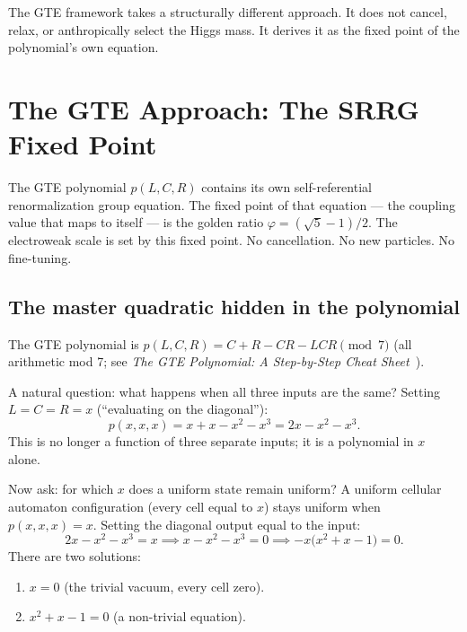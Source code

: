 \documentclass[11pt,a4paper]{article}
\begin{document}
\medskip

The GTE framework takes a structurally different approach.
It does not cancel, relax, or anthropically select the Higgs mass.
It derives it as the fixed point of the polynomial's own equation.

\section{The GTE Approach: The SRRG Fixed Point}
\label{sec:srrg}

\begin{tcolorbox}[colback=boxgreen,colframe=green!50!black,
  title=The key idea]
The GTE polynomial $p(L,C,R)$ contains its own self-referential
renormalization group equation.
The fixed point of that equation --- the coupling value that maps to itself ---
is the golden ratio $\varphi = (\sqrt{5}-1)/2$.
The electroweak scale is set by this fixed point.
No cancellation. No new particles. No fine-tuning.
\end{tcolorbox}

\subsection{The master quadratic hidden in the polynomial}

The GTE polynomial is $p(L,C,R) = C + R - CR - LCR \pmod{7}$
(all arithmetic mod 7; see \emph{The GTE Polynomial: A Step-by-Step
Cheat Sheet}~\cite{SpivackGTECompleteFramework,SpivackTutorialPolynomial}).

A natural question: what happens when all three inputs are the same?
Setting $L = C = R = x$ (``evaluating on the diagonal''):
\[
  p(x,x,x) = x + x - x^2 - x^3 = 2x - x^2 - x^3.
\]
This is no longer a function of three separate inputs; it is a polynomial in $x$ alone.

Now ask: for which $x$ does a uniform state remain uniform?
A uniform cellular automaton configuration (every cell equal to $x$)
stays uniform when $p(x,x,x) = x$.
Setting the diagonal output equal to the input:
\[
  2x - x^2 - x^3 = x \implies x - x^2 - x^3 = 0
  \implies -x\bigl(x^2 + x - 1\bigr) = 0.
\]
There are two solutions:
\begin{enumerate}[itemsep=2pt]
  \item $x = 0$ (the trivial vacuum, every cell zero).
  \item $x^2 + x - 1 = 0$ (a non-trivial equation).
\end{enumerate}
\end{document}
